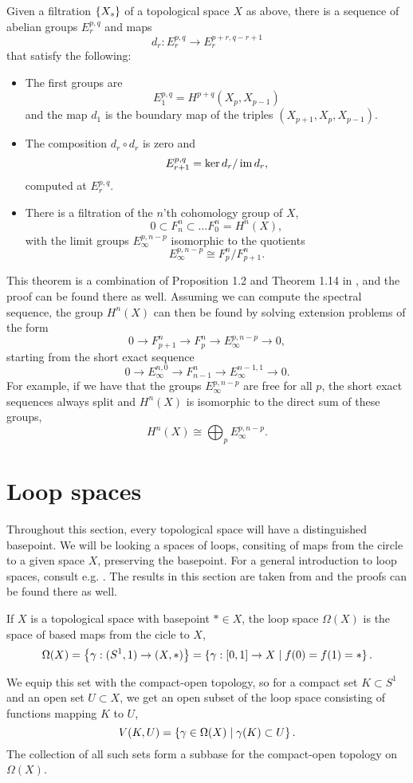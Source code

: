 \begin{theorem}
  \label{thm:ss}
  Given a filtration $\left\{ X_s \right\}$ of a topological space $X$ as above,
  there is a sequence of abelian groups $E_r^{p,q}$ and maps
  \[ d_r : E_r^{p,q} \to E_r^{p+r,q-r+1} \]
  that satisfy the following:
  \begin{itemize}
  \item The first groups are
    \[ E_1^{p,q} = H^{p+q}(X_p,X_{p-1}) \]
    and the map $d_1$ is the boundary map of the triples
    $(X_{p+1},X_p,X_{p-1})$.
  \item The composition $d_r \circ d_r$ is zero and
    \[ E_{r+1}^{p,q} = \ker d_r / \operatorname{im} d_r, \]
    computed at $E_r^{p,q}$.
  \item There is a filtration of the $n\!$'th cohomology group of $X$,
    \[ 0 \subset F_n^n \subset \dots F_0^n = H^n(X), \]
    with the limit groups $E_\infty^{p,n-p}$ isomorphic to the
    quotients
    \[ E_\infty^{p,n-p} \cong F_p^n / F_{p+1}^n. \]
  \end{itemize}
\end{theorem}

This theorem is a combination of Proposition 1.2 and Theorem 1.14 in
\cite{hatcherss}, and the proof can be found there as well. Assuming
we can compute the spectral sequence, the group $H^n(X)$ can then be
found by solving extension problems of the form
\[ 0 \to F_{p+1}^n \to F_p^n \to E_\infty^{p,n-p} \to 0, \]
starting from the short exact sequence
\[ 0 \to E_\infty^{n,0} \to F_{n-1}^n \to E_\infty^{n-1,1} \to 0. \]
For example, if we have that the groups $E_{\infty}^{p,n-p}$ are free
for all $p$, the short exact sequences always split and $H^n(X)$ is
isomorphic to the direct sum of these groups,
\[ H^n(X) \cong \bigoplus_p E_\infty^{p,n-p}. \]

\section{Loop spaces}
\label{sec:ls}

Throughout this section, every topological space will have a
distinguished basepoint. We will be looking a spaces of loops,
consiting of maps from the circle to a given space $X$, preserving the
basepoint. For a general introduction to loop spaces, consult e.g.
\cite{may}. The results in this section are taken from
\cite{milnor} and the proofs can be found there as well.

\begin{definition}
  If $X$ is a topological space with basepoint $*\in
  X$, the loop space $\Omega(X)$ is the space of based maps from the
  cicle to $X$,
  \[ \Omega(X) = \left\{  \gamma : (S^1,1)\to (X,*)  \right\} = \left\{  \gamma : [0,1] \to X
    \mid f(0) = f(1) = *  \right\}. \]

  We equip this set with the compact-open topology, so for a compact
  set $K \subset S^1$ and an open set $U \subset X$, we get an open
  subset of the loop space consisting of functions mapping $K$ to $U$,
  \[ V(K,U) = \left\{  \gamma\in \Omega(X) \mid \gamma(K) \subset U  \right\}. \]
  The collection of all such sets form a subbase for the compact-open
  topology on $\Omega(X)$.
\end{definition}

